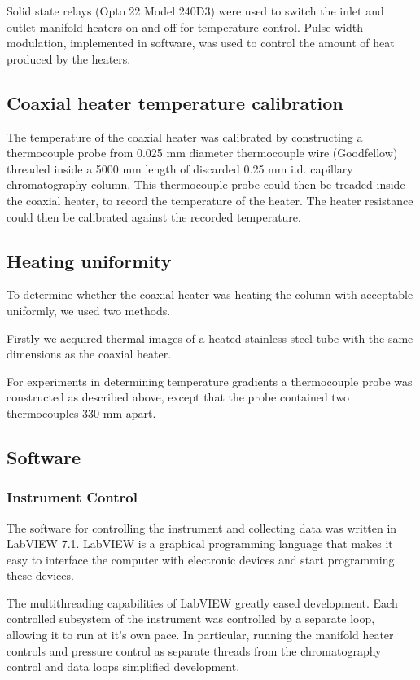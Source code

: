 \documentclass[aip,rsi,preprint,graphicx]{revtex4-1} %
\begin{document}
Solid state relays (Opto 22 Model 240D3) were used to switch the inlet and outlet manifold heaters on and off for temperature control. Pulse width modulation, implemented in software, was used to control the amount of heat produced by the heaters. 

\subsection{Coaxial heater temperature calibration}

The temperature of the coaxial heater was calibrated by constructing a thermocouple probe from 0.025 mm diameter thermocouple wire (Goodfellow) threaded inside a 5000 mm length of discarded 0.25 mm i.d. capillary chromatography column. This thermocouple probe could then be treaded inside the coaxial heater, to record the temperature of the heater. The heater resistance could then be calibrated against the recorded temperature. 

\subsection{Heating uniformity}

To determine whether the coaxial heater was heating the column with acceptable uniformly, we used two methods. 

Firstly we acquired thermal images of a heated stainless steel tube with the same dimensions as the coaxial heater. 

For experiments in determining temperature gradients a thermocouple probe was constructed as described above, except that the probe contained two thermocouples 330 mm apart. 

\subsection{Software}

\subsubsection{Instrument Control}
The software for controlling the instrument and collecting data was written in LabVIEW 7.1. LabVIEW is a graphical programming language that makes it easy to interface the computer with electronic devices and start programming these devices.

The multithreading capabilities of LabVIEW greatly eased development. Each controlled subsystem of the instrument was controlled by a separate loop, allowing it to run at it's own pace. In particular, running the manifold heater controls and pressure control as separate threads from the chromatography control and data loops simplified development.
\end{document}
